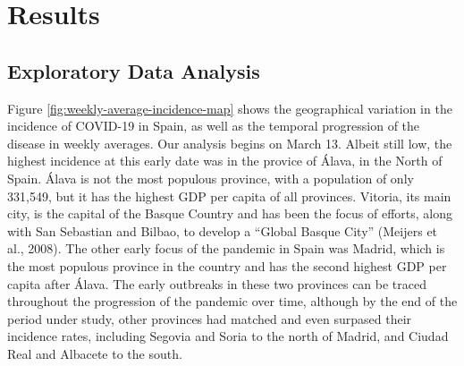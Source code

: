 \documentclass[]{elsarticle} %
\begin{document}
\hypertarget{results}{%
\section{Results}\label{results}}

\hypertarget{eda}{%
\subsection{Exploratory Data Analysis}\label{eda}}

Figure \ref{fig:weekly-average-incidence-map} shows the geographical
variation in the incidence of COVID-19 in Spain, as well as the temporal
progression of the disease in weekly averages. Our analysis begins on
March 13. Albeit still low, the highest incidence at this early date was
in the provice of Álava, in the North of Spain. Álava is not the most
populous province, with a population of only 331,549, but it has the
highest GDP per capita of all provinces. Vitoria, its main city, is the
capital of the Basque Country and has been the focus of efforts, along
with San Sebastian and Bilbao, to develop a ``Global Basque City''
(Meijers et al., 2008). The other early focus of the pandemic in Spain
was Madrid, which is the most populous province in the country and has
the second highest GDP per capita after Álava. The early outbreaks in
these two provinces can be traced throughout the progression of the
pandemic over time, although by the end of the period under study, other
provinces had matched and even surpased their incidence rates, including
Segovia and Soria to the north of Madrid, and Ciudad Real and Albacete
to the south.
\end{document}
